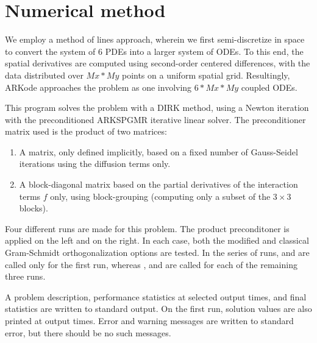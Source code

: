 \documentclass[letterpaper,10pt,english]{sphinxmanual}
\begin{document}
\section{Numerical method}
\label{ark_KrylovDemo_prec:numerical-method}
We employ a method of lines approach, wherein we first
semi-discretize in space to convert the system of 6 PDEs into a larger
system of ODEs.  To this end, the spatial derivatives are computed
using second-order centered differences, with the data distributed
over $Mx*My$ points on a uniform spatial grid.  Resultingly, ARKode
approaches the problem as one involving $6*Mx*My$ coupled ODEs.

This program solves the problem with a DIRK method, using a Newton
iteration with the preconditioned ARKSPGMR iterative linear solver.
The preconditioner matrix used is the product of two matrices:
\begin{enumerate}
\item {} 
A matrix, only defined implicitly, based on a fixed number of
Gauss-Seidel iterations using the diffusion terms only.

\item {} 
A block-diagonal matrix based on the partial derivatives of the
interaction terms $f$ only, using block-grouping (computing
only a subset of the $3\times3$ blocks).

\end{enumerate}

Four different runs are made for this problem.  The product
preconditoner is applied on the left and on the right.  In each case,
both the modified and classical Gram-Schmidt orthogonalization options
are tested.  In the series of runs,  and 
are called only for the first run, whereas ,
 and  are called for each
of the remaining three runs.

A problem description, performance statistics at selected output
times, and final statistics are written to standard output.  On the
first run, solution values are also printed at output times.  Error
and warning messages are written to standard error, but there should
be no such messages.
\end{document}
